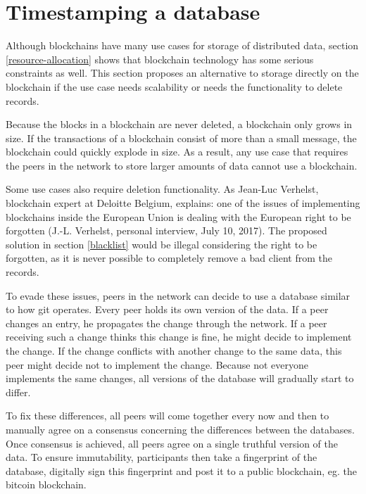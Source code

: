 \section{Timestamping a database}
\label{timestamping-db}


Although blockchains have many use cases for storage of distributed data, section \ref{resource-allocation} shows that blockchain technology has some serious constraints as well. This section proposes an alternative to storage directly on the blockchain if the use case needs scalability or needs the functionality to delete records. 

Because the blocks in a blockchain are never deleted, a blockchain only grows in size. If the transactions of a blockchain consist of more than a small message, the blockchain could quickly explode in size. As a result, any use case that requires the peers in the network to store larger amounts of data cannot use a blockchain.

Some use cases also require deletion functionality. As Jean-Luc Verhelst, blockchain expert at Deloitte Belgium, explains: one of the issues of implementing blockchains inside the European Union is dealing with the European right to be forgotten (J.-L. Verhelst, personal interview, July 10, 2017). The proposed solution in section \ref{blacklist} would be illegal considering the right to be forgotten, as it is never possible to completely remove a bad client from the records. 

To evade these issues, peers in the network can decide to use a database similar to how git operates. Every peer holds its own version of the data. If a peer changes an entry, he propagates the change through the network. If a peer receiving such a change thinks this change is fine, he might decide to implement the change. If the change conflicts with another change to the same data, this peer might decide not to implement the change. Because not everyone implements the same changes, all versions of the database will gradually start to differ. 

To fix these differences, all peers will come together every now and then to manually agree on a consensus concerning the differences between the databases. Once consensus is achieved, all peers agree on a single truthful version of the data. To ensure immutability, participants then take a fingerprint of the database, digitally sign this fingerprint and post it to a public blockchain, eg. the bitcoin blockchain.

